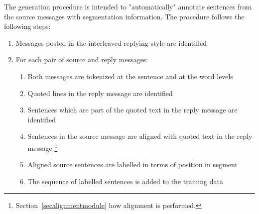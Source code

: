 


The generation procedure is intended to "automatically" annotate sentences from the source messages with segmentation information.
The procedure follows the following steps:
\begin{enumerate}[itemsep=0mm]
\item Messages posted in the interleaved replying style are identified
\item For each pair of source and reply messages:
\begin{enumerate}
\item Both messages are tokenized at the sentence and at the word levels
\item Quoted lines in the reply message are identified
\item Sentences which are part of the quoted text in the reply message are identified 
\item Sentences in the source message are aligned with  quoted text in the reply message \footnote{Section~\ref{secalignmentmodule} how alignment is performed.}
\item Aligned source sentences are labelled in terms of position in segment %
\item The sequence of labelled sentences is added to the training data %
\end{enumerate}
\end{enumerate}

